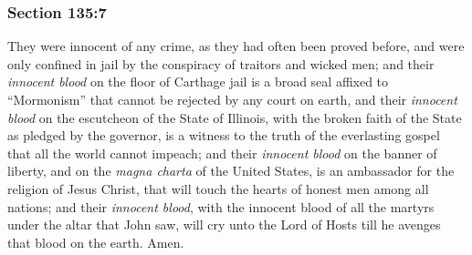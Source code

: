 	\subsubsection{Section 135:7} %
		\label{DC135-7}

		They were innocent of any crime, as they had often been proved before, and were only confined in jail by the conspiracy of traitors and wicked men; and their \textit{innocent blood} on the floor of Carthage jail is a broad seal affixed to ``Mormonism'' that cannot be rejected by any court on earth, and their \textit{innocent blood} on the escutcheon of the State of Illinois, with the broken faith of the State as pledged by the governor, is a witness to the truth of the everlasting gospel that all the world cannot impeach; and their \textit{innocent blood} on the banner of liberty, and on the \textit{magna charta} of the United States, is an ambassador for the religion of Jesus Christ, that will touch the hearts of honest men among all nations; and their \textit{innocent blood}, with the innocent blood of all the martyrs under the altar that John saw, will cry unto the Lord of Hosts till he avenges that blood on the earth.  Amen.

